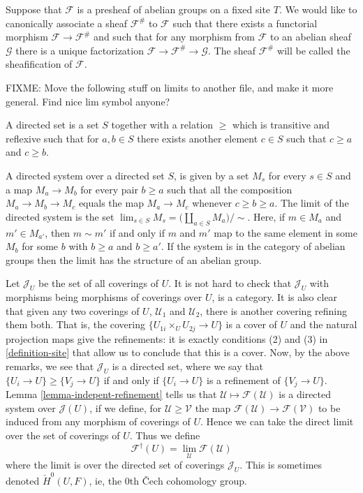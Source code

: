 \smallskip\noindent
Suppose that $\mathcal{F}$ is a presheaf of abelian groups on a
fixed site $T$.  We would like to canonically associate a sheaf
$\mathcal{F}^\#$ to $\mathcal{F}$ such that there exists a
functorial morphism $\mathcal{F} \rightarrow \mathcal{F}^\#$ and such that for
any morphism from $\mathcal{F}$ to an abelian sheaf $\mathcal{G}$
there is a unique factorization $\mathcal{F} \rightarrow
\mathcal{F}^\# \rightarrow \mathcal{G}$. The sheaf $\mathcal{F}^\#$ will be
called the sheafification of $\mathcal{F}$.

\smallskip\noindent
FIXME: Move the following stuff on limits to another file, and make it
more general. Find nice lim symbol anyone?

\begin{definition}
A directed set is a set $S$ together with a relation $\geq$ which is
transitive and reflexive such that for $a, b \in S$ there exists another
element $c \in S$ such that $c \geq a$ and $c \geq b$.
\end{definition}

\noindent
A directed system over a directed set $S$, is given by a set $M_s$ for
every $s\in S$ and a map $M_a \to M_b$ for every pair $b\geq a$ such
that all the composition $M_a \to M_b \to M_c$ equals the map
$M_a \to M_c$ whenever $c \geq b \geq a$. The limit of the directed system
is the set $\lim_{s\in S} M_s = \big(\coprod_{a\in S} M_a\big)/\sim$. Here,
if $m\in M_a$ and $m'\in M_{a'}$, then $m \sim m'$ if and only if $m$ and $m'$
map to the same element in some $M_b$ for some $b$ with $b\geq a$ and
$b \geq a'$. If the system is in the category of abelian groups then the
limit has the structure of an abelian group.

\noindent
Let $\mathcal{J}_U$ be the set of all coverings of $U$. It is not hard to
check that $\mathcal{J}_U$ with morphisms being morphisms of coverings
over $U$, is a category. It is also clear that given any two coverings of $U$,
$\mathcal{U}_1$ and $\mathcal{U}_2$, there is another covering refining them
both. That is, the covering $\{U_{1i} \times_U U_{2j} \rightarrow U\}$ is a
cover of $U$ and the natural projection maps give the refinements: it is
exactly conditions (2) and (3) in \ref{definition-site} that allow us to conclude
that this is a cover. Now, by the above remarks, we see that $\mathcal{J}_U$
is a directed set, where we say that $\{U_i \to U\} \geq \{V_j \to U\}$ if 
and only if $\{U_i \to U\}$ is a refinement of $\{V_j \to U\}$. Lemma
\ref{lemma-indepent-refinement} tells us that $\mathcal{U} \mapsto
\mathcal{F}(\mathcal{U})$ is a directed system over $\mathcal{J}(U)$, if
we define, for $\mathcal{U} \geq \mathcal{V}$ the map 
$\mathcal{F}(\mathcal{U}) \to \mathcal{F}(\mathcal{V})$ to be induced from any
morphism of coverings of $U$. Hence we can take the direct limit over the set
of coverings of $U$. Thus we define 
$$
\mathcal{F}^\dagger(U) = \lim_{\mathcal{U}}\mathcal{F}(\mathcal{U})
$$
where the limit is over the directed set of coverings $\mathcal{J}_U$.
This is sometimes denoted $\check{H}^0(U, F)$, ie, the $0$th \v{C}ech
cohomology group. 

